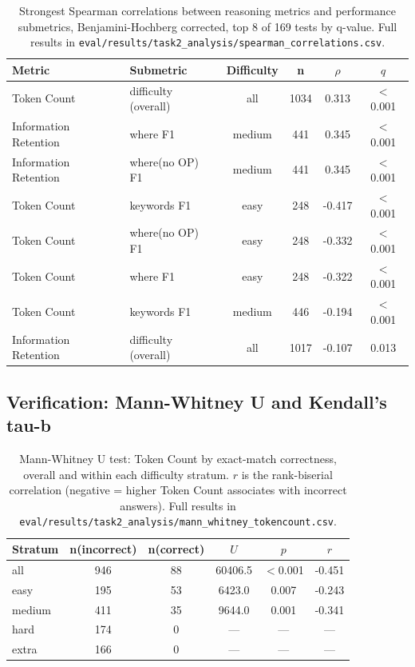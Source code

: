 \begin{table}[H]
\centering
\footnotesize
\caption{Strongest Spearman correlations between reasoning metrics and performance submetrics, Benjamini-Hochberg corrected, top 8 of 169 tests by q-value. Full results in \texttt{eval/results/task2\_analysis/spearman\_correlations.csv}.}
\label{tab:rq2-correlations}
\begin{tabular}{llcccc}
\toprule
Metric & Submetric & Difficulty & n & $\rho$ & $q$ \\
\midrule
Token Count & difficulty (overall) & all & 1034 & 0.313 & $<$0.001 \\
Information Retention & where F1 & medium & 441 & 0.345 & $<$0.001 \\
Information Retention & where(no OP) F1 & medium & 441 & 0.345 & $<$0.001 \\
Token Count & keywords F1 & easy & 248 & -0.417 & $<$0.001 \\
Token Count & where(no OP) F1 & easy & 248 & -0.332 & $<$0.001 \\
Token Count & where F1 & easy & 248 & -0.322 & $<$0.001 \\
Token Count & keywords F1 & medium & 446 & -0.194 & $<$0.001 \\
Information Retention & difficulty (overall) & all & 1017 & -0.107 & 0.013 \\
\bottomrule
\end{tabular}
\end{table}

\subsection{Verification: Mann-Whitney U and Kendall's tau-b}
\label{sec:rq2-verification}

\begin{table}[H]
\centering
\footnotesize
\caption{Mann-Whitney U test: Token Count by exact-match correctness, overall and within each difficulty stratum. $r$ is the rank-biserial correlation (negative = higher Token Count associates with incorrect answers). Full results in \texttt{eval/results/task2\_analysis/mann\_whitney\_tokencount.csv}.}
\label{tab:rq2-mw-tokencount}
\begin{tabular}{lccccc}
\toprule
Stratum & n(incorrect) & n(correct) & $U$ & $p$ & $r$ \\
\midrule
all & 946 & 88 & 60406.5 & $<$0.001 & -0.451 \\
easy & 195 & 53 & 6423.0 & 0.007 & -0.243 \\
medium & 411 & 35 & 9644.0 & 0.001 & -0.341 \\
hard & 174 & 0 & --- & --- & --- \\
extra & 166 & 0 & --- & --- & --- \\
\bottomrule
\end{tabular}
\end{table}

